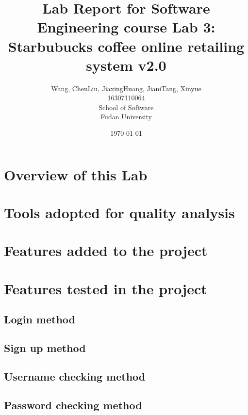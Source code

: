 \documentclass[a4paper]{report}
\title{Lab Report for Software Engineering course \newline
 Lab 3: Starbubucks coffee online retailing system v2.0}
\author{Wang, Chen\qquad Liu, Jiaxing\qquad Huang, Jiani\qquad Tang, Xinyue \\
16307110064\qquad17302010049\qquad 17302010063\qquad 16307110476 \\
School of Software\\
Fudan University
 }
\date{\today}
\begin{document}
\maketitle

\tableofcontents
\chapter{Overview of this Lab}



\chapter{Tools adopted for quality analysis}






\chapter{Features added to the project}



\chapter{Features tested in the project}
\section{Login method}



\section{Sign up method}



\section{Username checking method}




\section{Password checking method}
\end{document}
